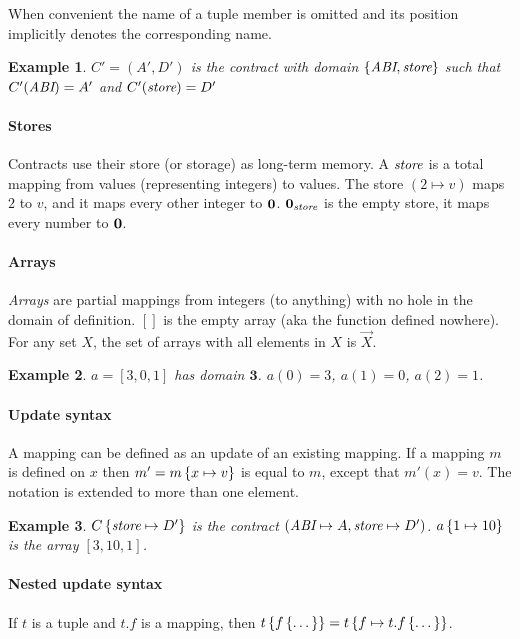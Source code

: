\documentclass[12pt]{extarticle}
\newtheorem{example}{Example}
\begin{document}
When convenient the name of a tuple member is omitted and its position implicitly denotes the corresponding name. 
\begin{example}
$C' = (A',D')$ is the contract with domain $\left\{\textit{ABI},\textit{store}\right\}$ such that $C'(\textit{ABI}) = A'$ and $C'(\textit{store}) = D'$
\end{example}

\paragraph{Stores} Contracts use their store (or storage) as long-term memory. A $\textit{store}$ is a total mapping from values (representing integers) to values. The store $(2\mapsto v)$ maps $2$ to $v$, and it maps every other integer to $\mathbf{0}$. $\mathbf{0}_\textit{store}$ is the empty store, it maps every number to $\mathbf{0}$.

\paragraph{Arrays}
\emph{Arrays} are partial mappings from integers (to anything) with no hole in the domain of definition. $[]$ is the empty array (aka the function defined nowhere). For any set $X$, the set of arrays with all elements in $X$ is $\vec X$.
\begin{example}
$a = [3,0,1]$ has domain $\mathbf{3}$. $a(0) = 3$, $a(1) = 0$, $a(2) = 1$.
\end{example}

\def\Dom{\textrm{Dom}}
\paragraph{Update syntax}
A mapping can be defined as an update of an existing mapping. If a mapping $m$ is defined on $x$ then $m' = m\left\{x\mapsto v\right\}$ is equal to $m$, except that $m'(x) =v$. The notation is extended to more than one element.

\begin{example} 
$C\left\{\textit{store}\mapsto D'\right\}$ is the contract $(\textit{ABI}\mapsto A,\textit{store}\mapsto D')$. $a\left\{1\mapsto10\right\}$ is the array $[3,10,1]$.
\end{example}

\paragraph{Nested update syntax} If $t$ is a tuple and $t.f$ is a mapping, then $t\left\{f\left\{\dots\right\}\right\} = t\left\{f\mapsto t.f\left\{\dots\right\}\right\}$.
\end{document}
